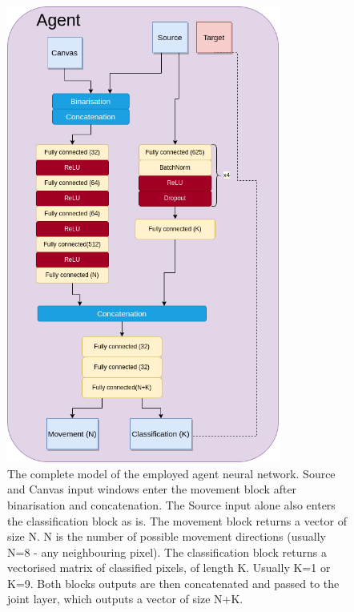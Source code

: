\begin{figure}[ht]
  \centering
  \includegraphics[width=0.8\textwidth]{figures/chapter7/lartpc_rl_network.drawio.png}
  \caption{The complete model of the employed agent neural network. Source and Canvas input windows enter the movement block after binarisation and concatenation. The Source input alone also enters the classification block as is. The movement block returns a vector of size N. N is the number of possible movement directions (usually N=8 - any neighbouring pixel). The classification block returns a vectorised matrix of classified pixels, of length K. Usually K=1 or K=9. Both blocks outputs are then concatenated and passed to the joint layer, which outputs a vector of size N+K.}
  \label{fig:rl_net}
\end{figure}

